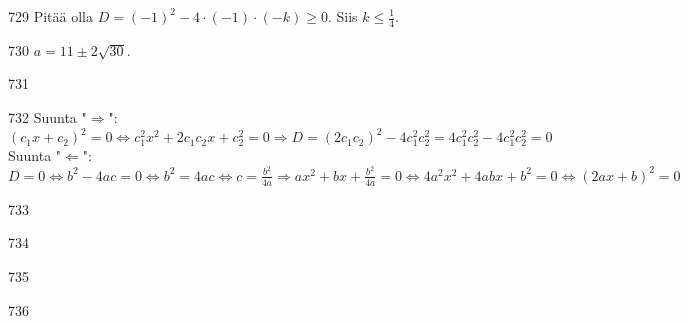 \begin{Vastaus}{729}
		Pitää olla $D=(-1)^2-4 \cdot (-1) \cdot (-k) \geq 0$. Siis $k \leq \frac{1}{4}$.
	
\end{Vastaus}
\begin{Vastaus}{730}
		$a =11 \pm 2\sqrt{30}$.
	
\end{Vastaus}
\begin{Vastaus}{731}
	
\end{Vastaus}
\begin{Vastaus}{732}
		Suunta "$\Rightarrow$": $(c_1 x+ c_2)^2=0 \Leftrightarrow c_1^2 x^2 + 2c_1 c_2 x+ c_2^2 =0 \Rightarrow
		D=(2 c_1 c_2)^2-4 c_1^2 c_2^2 =4 c_1^2 c_2^2 -4 c_1^2 c_2^2 =0$ \\
		Suunta "$\Leftarrow$": $D=0 \Leftrightarrow b^2-4ac=0 \Leftrightarrow b^2=4ac \Leftrightarrow c=\frac{b^2}{4a} \Rightarrow ax^2+bx+\frac{b^2}{4a}=0 \Leftrightarrow 4a^2x^2+4abx+b^2=0 \Leftrightarrow (2ax+b)^2=0$
	
\end{Vastaus}
\begin{Vastaus}{733}
    
\end{Vastaus}
\begin{Vastaus}{734}
    
\end{Vastaus}
\begin{Vastaus}{735}
    
\end{Vastaus}
\begin{Vastaus}{736}
  
\end{Vastaus}
